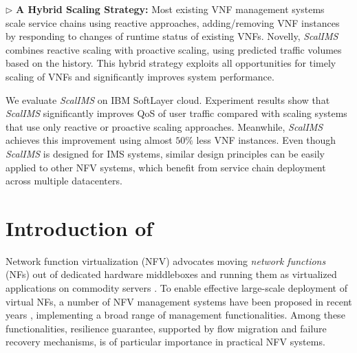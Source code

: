 $\triangleright$ \textbf{A Hybrid Scaling Strategy:} Most existing VNF management systems~\cite{wood2007black}~\cite{gember2012stratos} scale service chains using reactive approaches, adding/removing VNF instances by responding to changes of runtime status of existing VNFs. Novelly, \textit{ScalIMS} combines reactive scaling with proactive scaling, using predicted traffic volumes based on the history. This hybrid strategy exploits all opportunities for timely scaling of VNFs and significantly improves system performance.

We evaluate \textit{ScalIMS} on IBM SoftLayer cloud. Experiment results show that \textit{ScalIMS} significantly improves QoS of user traffic compared with scaling systems that use only reactive or proactive scaling approaches. Meanwhile, \textit{ScalIMS} achieves this improvement %
 using almost $50\%$ less VNF instances. %
Even though \textit{ScalIMS} is designed for IMS systems, similar design principles can be easily applied to other NFV systems, which benefit from service chain deployment across multiple datacenters.

\section{Introduction of \nfactor}

Network function virtualization (NFV) advocates moving
{\em network functions} (NFs) out of dedicated hardware middleboxes and running them as virtualized applications on commodity servers \cite{nfv-white-paper}. To enable effective large-scale deployment of virtual NFs, a number of NFV management systems have been proposed in recent years \cite{palkar2015e2, OpenBox, sekar2012design, anderson2012xomb, gember2012stratos, zhang2016opennetvm}, implementing a broad range of management functionalities. Among these functionalities, resilience guarantee, supported by flow migration and failure recovery mechanisms, is of particular importance in practical NFV systems.

